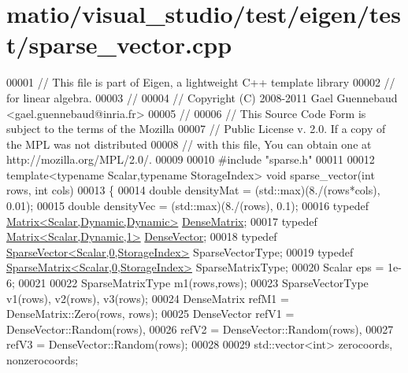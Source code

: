 \hypertarget{matio_2visual__studio_2test_2eigen_2test_2sparse__vector_8cpp_source}{}\section{matio/visual\+\_\+studio/test/eigen/test/sparse\+\_\+vector.cpp}
\label{matio_2visual__studio_2test_2eigen_2test_2sparse__vector_8cpp_source}

\begin{DoxyCode}
00001 \textcolor{comment}{// This file is part of Eigen, a lightweight C++ template library}
00002 \textcolor{comment}{// for linear algebra.}
00003 \textcolor{comment}{//}
00004 \textcolor{comment}{// Copyright (C) 2008-2011 Gael Guennebaud <gael.guennebaud@inria.fr>}
00005 \textcolor{comment}{//}
00006 \textcolor{comment}{// This Source Code Form is subject to the terms of the Mozilla}
00007 \textcolor{comment}{// Public License v. 2.0. If a copy of the MPL was not distributed}
00008 \textcolor{comment}{// with this file, You can obtain one at http://mozilla.org/MPL/2.0/.}
00009 
00010 \textcolor{preprocessor}{#include "sparse.h"}
00011 
00012 \textcolor{keyword}{template}<\textcolor{keyword}{typename} Scalar,\textcolor{keyword}{typename} StorageIndex> \textcolor{keywordtype}{void} sparse\_vector(\textcolor{keywordtype}{int} rows, \textcolor{keywordtype}{int} cols)
00013 \{
00014   \textcolor{keywordtype}{double} densityMat = (std::max)(8./(rows*cols), 0.01);
00015   \textcolor{keywordtype}{double} densityVec = (std::max)(8./(rows), 0.1);
00016   \textcolor{keyword}{typedef} \hyperlink{group___core___module}{Matrix<Scalar,Dynamic,Dynamic>} 
      \hyperlink{group___core___module}{DenseMatrix};
00017   \textcolor{keyword}{typedef} \hyperlink{group___core___module}{Matrix<Scalar,Dynamic,1>} \hyperlink{group___core___module}{DenseVector};
00018   \textcolor{keyword}{typedef} \hyperlink{group___sparse_core___module_class_eigen_1_1_sparse_vector}{SparseVector<Scalar,0,StorageIndex>} SparseVectorType;
00019   \textcolor{keyword}{typedef} \hyperlink{group___sparse_core___module_class_eigen_1_1_sparse_matrix}{SparseMatrix<Scalar,0,StorageIndex>} SparseMatrixType;
00020   Scalar eps = 1e-6;
00021 
00022   SparseMatrixType m1(rows,rows);
00023   SparseVectorType v1(rows), v2(rows), v3(rows);
00024   DenseMatrix refM1 = DenseMatrix::Zero(rows, rows);
00025   DenseVector refV1 = DenseVector::Random(rows),
00026               refV2 = DenseVector::Random(rows),
00027               refV3 = DenseVector::Random(rows);
00028 
00029   std::vector<int> zerocoords, nonzerocoords;

\end{DoxyCode}

